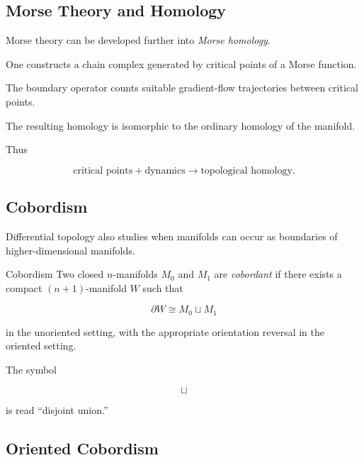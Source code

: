 \subsection{Morse Theory and Homology}
\label{subsec:morse-homology-connection}

Morse theory can be developed further into \emph{Morse homology}.

One constructs a chain complex generated by critical points of a Morse
function.

The boundary operator counts suitable gradient-flow trajectories between
critical points.

The resulting homology is isomorphic to the ordinary homology of the
manifold.

Thus

\[
\boxed{
\text{critical points}
+
\text{dynamics}
\longrightarrow
\text{topological homology}.
}
\]

\subsection{Cobordism}
\label{subsec:cobordism-introduction}

Differential topology also studies when manifolds can occur as boundaries of
higher-dimensional manifolds.

\begin{definitionbox}{Cobordism}
Two closed \(n\)-manifolds \(M_0\) and \(M_1\) are \emph{cobordant} if there
exists a compact \((n+1)\)-manifold \(W\) such that

\[
\boxed{
\partial W
\cong
M_0\sqcup M_1
}
\]

in the unoriented setting, with the appropriate orientation reversal in the
oriented setting.
\end{definitionbox}

The symbol

\[
\sqcup
\]

is read ``disjoint union.''

\subsection{Oriented Cobordism}
\label{subsec:oriented-cobordism}

